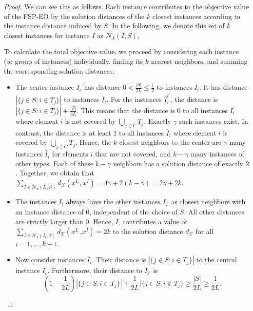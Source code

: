 \documentclass[11pt, a4paper]{article}
\newcommand{\fspeo}{FSP-EO\xspace}
\newcommand{\FRil}[1]{\todo[color=black, textcolor=white, inline, author=FR]{#1}}
\newcommand{\MHil}[1]{\todo[color=gray, textcolor=yellow, inline, author=MH]{#1}}
\newcommand{\X}{{\mathcal{X}}} %
\newcommand{\instanceindex}{i}
\newcommand{\instanceindextwo}{j}
\newcommand{\fsel}{S} %
\newcommand{\selectionset}{\fsel}
\newcommand{\x}{{x}}
\newcommand{\soldist}[1][(\instanceindex,\instanceindextwo)]{d_\X#1} %
\newcommand{\neighbour}{\ensuremath{\mathcal{N}}}
\newcommand{\skGen}[1][(\instanceindex,\selectionset)]{\neighbour_k#1}
\begin{document}
\begin{proof}
We can see this as follows. Each instance contributes to the objective value of the \fspeo by the solution distances of the $k$ closest instances according to the instance distance induced by $\fsel$. In the following, we denote this set of $k$ closest instances for instance $I$ as $\skGen[(I, \fsel)]$,

To calculate the total objective value, we proceed by considering each
instance (or group of instances) individually, finding its $k$ nearest neighbors, and summing the corresponding solution distances.
\begin{itemize}
	\item The center instance $I_c$ has distance $0 < \frac{|\fsel|}{2L}
          \leq \frac{1}{2}$ to instances $I_{i}$. It has distance
          $|\{j\in \fsel: i \in T_j\}|$ to instances $\bar{I}_{i}$.
          For the instances $\bar{I}_i^{\ell^\prime}$, the distance is
           $|\{j\in \fsel: i \in T_j\}| + \frac{|\fsel|}{3L}$.
          This means that the distance is
          $0$ to all instances $\bar{I}_i$ where
          element $i$ is not covered by $\bigcup_{j \in C}T_j$. Exactly $\gamma$ such instances exist. In contrast, the distance is at least $1$ to all instances $\bar{I}_i$ where element $i$ is covered by $\bigcup_{j \in
            C}T_j$. Hence, the $k$ closest neighbors to the center are
          $\gamma$ many instances $\bar{I}_i$ for elements $i$ that
          are not covered, and $k-\gamma$ many instances of other
          types. Each of these $k-\gamma$ neighbors has a solution distance of exactly $2$.
	Together, we obtain that $\sum_{I \in \skGen[(I_c, \fsel)]} \soldist[(\x^{I_c}, \x^{I})] = 4\gamma + 2(k-\gamma) = 2\gamma + 2k$.
	\item The instances $I_i$ always have the other instances $I_{i^\prime}$ as closest neighbors with an instance distance of $0$, independent of the choice of $\fsel$. All other distances are strictly larger than $0$. Hence, $I_i$ contributes a value of $\sum_{I \in \skGen[(I_i, \fsel)]} d_\mathcal{X}(\x^{I_i}, \x^{I}) = 2k$ to the solution distance $\soldist[]$ for all $i = 1,...,k+1$.
	\item Now consider instances $\bar{I}_i$. Their distance is $|\{j\in \fsel: i\in T_j\}|$ to the central instance $I_c$. Furthermore, their distance to $I_{i'}$ is
	\[ (1-\frac{1}{2L})|\{j\in \fsel: i\in T_j\}| + \frac{1}{2L}|\{j\in \fsel: i\notin T_j\} \ge \frac{|\fsel|}{2L} \geq \frac{1}{2L}. \]

\end{itemize}
\end{proof}
\end{document}
